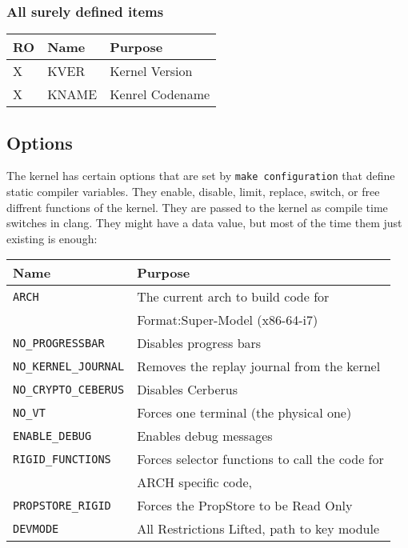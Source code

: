 \documentclass[12pt]{article}
\begin{document}
\subsubsection{All surely defined items}

\begin{tabular}{lll}
\hline
RO & Name & Purpose \\
\hline
X & KVER & Kernel Version  \\
X & KNAME & Kenrel Codename \\
\hline
\end{tabular}
\subsection{Options}
The kernel has certain options that are set by \verb+make configuration+ that define static compiler variables. They enable, disable, limit, replace, switch, or free diffrent functions of the kernel.
They are passed to the kernel as compile time switches in clang. They might have a data value, but most of the time them just existing is enough:

\begin{tabular}{|l|l|}
\hline
Name & Purpose \\
\hline

\verb+ARCH+ & The current arch to build code for \\
& Format:Super-Model (x86-64-i7) \\
\hline

\verb+NO_PROGRESSBAR+ & Disables progress bars  \\
\hline

\verb+NO_KERNEL_JOURNAL+ & Removes the replay journal from the kernel \\
\hline

\verb+NO_CRYPTO_CEBERUS+ & Disables Cerberus\\
\hline

\verb+NO_VT+ & Forces one terminal (the physical one)\\
\hline

\verb+ENABLE_DEBUG+ & Enables debug messages \\
\hline

\verb+RIGID_FUNCTIONS+ & Forces selector functions to call the code for\\
& ARCH specific code, \\
\hline

\verb+PROPSTORE_RIGID+ & Forces the PropStore to be Read Only\\
\hline

\verb+DEVMODE+ & All Restrictions Lifted, path to key module\\
\hline

\end{tabular}
\end{document}
